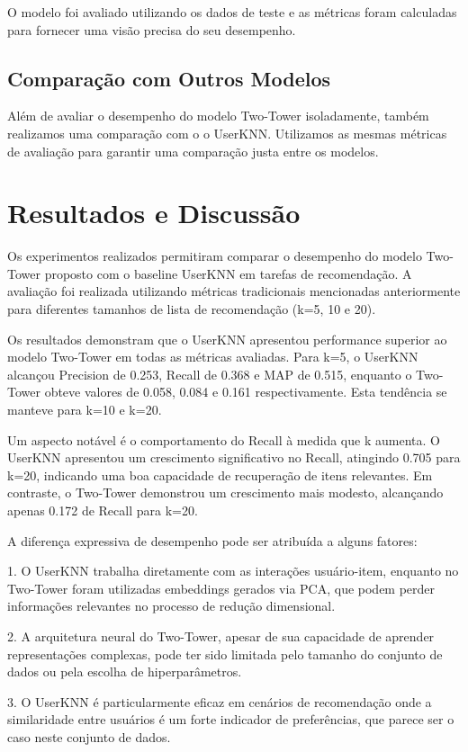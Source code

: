 \documentclass[sigconf]{acmart}
\begin{document}
O modelo foi avaliado utilizando os dados de teste e as métricas foram calculadas para fornecer uma visão precisa do seu desempenho.

\subsection{Comparação com Outros Modelos}

Além de avaliar o desempenho do modelo Two-Tower isoladamente, também realizamos uma comparação com o o UserKNN. Utilizamos as mesmas métricas de avaliação para garantir uma comparação justa entre os modelos. 

\section{Resultados e Discussão}

Os experimentos realizados permitiram comparar o desempenho do modelo Two-Tower proposto com o baseline UserKNN em tarefas de recomendação. A avaliação foi realizada utilizando métricas tradicionais mencionadas anteriormente para diferentes tamanhos de lista de recomendação (k=5, 10 e 20).

Os resultados demonstram que o UserKNN apresentou performance superior ao modelo Two-Tower em todas as métricas avaliadas. Para k=5, o UserKNN alcançou Precision de 0.253, Recall de 0.368 e MAP de 0.515, enquanto o Two-Tower obteve valores de 0.058, 0.084 e 0.161 respectivamente. Esta tendência se manteve para k=10 e k=20.

Um aspecto notável é o comportamento do Recall à medida que k aumenta. O UserKNN apresentou um crescimento significativo no Recall, atingindo 0.705 para k=20, indicando uma boa capacidade de recuperação de itens relevantes. Em contraste, o Two-Tower demonstrou um crescimento mais modesto, alcançando apenas 0.172 de Recall para k=20.

A diferença expressiva de desempenho pode ser atribuída a alguns fatores:

1. O UserKNN trabalha diretamente com as interações usuário-item, enquanto no Two-Tower foram utilizadas embeddings gerados via PCA, que podem perder informações relevantes no processo de redução dimensional.

2. A arquitetura neural do Two-Tower, apesar de sua capacidade de aprender representações complexas, pode ter sido limitada pelo tamanho do conjunto de dados ou pela escolha de hiperparâmetros.

3. O UserKNN é particularmente eficaz em cenários de recomendação onde a similaridade entre usuários é um forte indicador de preferências, que parece ser o caso neste conjunto de dados.
\end{document}
